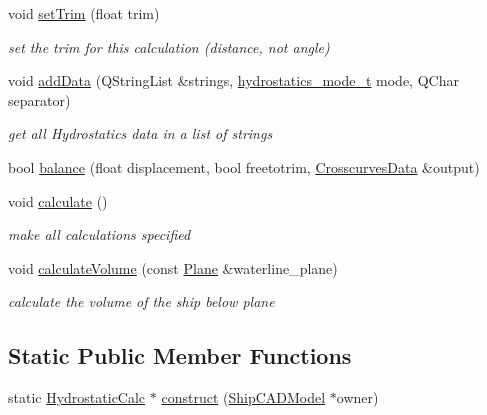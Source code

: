 \begin{DoxyCompactItemize}
void \hyperlink{classShipCAD_1_1HydrostaticCalc_ace579596fa77d8e3ea4f854ca033ed83}{set\-Trim} (float trim)
\begin{DoxyCompactList}\small\item\em set the trim for this calculation (distance, not angle) \end{DoxyCompactList}\item 
void \hyperlink{classShipCAD_1_1HydrostaticCalc_a919bce0b984cbef1c59534d6e9fec46f}{add\-Data} (Q\-String\-List \&strings, \hyperlink{namespaceShipCAD_a2c84d37615dd30be37ed0253501fb9a3}{hydrostatics\-\_\-mode\-\_\-t} mode, Q\-Char separator)
\begin{DoxyCompactList}\small\item\em get all Hydrostatics data in a list of strings \end{DoxyCompactList}\item 
bool \hyperlink{classShipCAD_1_1HydrostaticCalc_a7573a510a6b53e56a79f4042e41ee89e}{balance} (float displacement, bool freetotrim, \hyperlink{structShipCAD_1_1CrosscurvesData}{Crosscurves\-Data} \&output)
\item 
void \hyperlink{classShipCAD_1_1HydrostaticCalc_ab0c8f5dc5c576e6e9eae5fb27fd5bdd0}{calculate} ()
\begin{DoxyCompactList}\small\item\em make all calculations specified \end{DoxyCompactList}\item 
void \hyperlink{classShipCAD_1_1HydrostaticCalc_ad37fd32bf358c96b6653c6c92fd92c20}{calculate\-Volume} (const \hyperlink{classShipCAD_1_1Plane}{Plane} \&waterline\-\_\-plane)
\begin{DoxyCompactList}\small\item\em calculate the volume of the ship below plane \end{DoxyCompactList}\end{DoxyCompactItemize}
\subsection*{Static Public Member Functions}
\begin{DoxyCompactItemize}
\item 
static \hyperlink{classShipCAD_1_1HydrostaticCalc}{Hydrostatic\-Calc} $\ast$ \hyperlink{classShipCAD_1_1HydrostaticCalc_a527c0f0526a159e3d7cb7ddd4925c295}{construct} (\hyperlink{classShipCAD_1_1ShipCADModel}{Ship\-C\-A\-D\-Model} $\ast$owner)
\end{DoxyCompactItemize}
